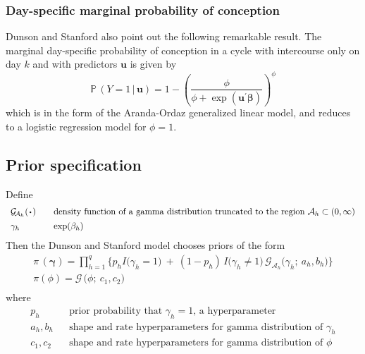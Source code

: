 \documentclass[11pt]{article}
\newcommand{\prob}{\mathbb{P}\,}
\renewcommand{\vec}{\boldsymbol}
\newcommand{\barS}{\,|\,}
\newcommand{\ind}{I}
\newcommand{\cdotB}{\raisebox{-0.5ex}{\scalebox{1.75}{$\cdot$}}}
\begin{document}

\subsubsection{Day-specific marginal probability of conception}
Dunson and Stanford also point out the following remarkable result.  The marginal day-specific probability of conception in a cycle with intercourse only on day $k$ and with predictors $\vec{u}$ is given by
\[ \prob( Y = 1 \barS \vec{u} ) = 1 - \left( \frac{ \phi }{ \phi + \exp(\vec{u}^\prime \vec{\beta}) } \right)^\phi \]
which is in the form of the Aranda-Ordaz generalized linear model, and reduces to a logistic regression model for $\phi = 1$.







\subsection{Prior specification}

Define 
\[ \begin{array}{lll}
\mathcal{G}_{\!\mathcal{A}_h} ( \cdotB ) & & \text{density function of a gamma distribution truncated to the region $\mathcal{A}_h \subset (0,\infty)$} \\[1ex]
\gamma_h & & \exp( \beta_h ) 
\end{array} \]
Then the Dunson and Stanford model chooses priors of the form
\[ \begin{array}{l}
\pi\,(\vec{\gamma}) = \displaystyle \prod_{h=1}^q \bigg\{ p_h \ind\big( \gamma_h = 1 \big) ~+~ (1 - p_h)\, \ind\big( \gamma_h \ne 1 \big)\, \mathcal{G}_{\mathcal{A}_h} \big( \gamma_h;~ a_h, b_h \big) \bigg\} \\[3ex]
\pi(\phi) = \mathcal{G}\, \big(\phi;~ c_1, c_2\big) \\
\end{array} \]
where
\[ \begin{array}{lll}
p_h & & \text{prior probability that $\gamma_h=1$, a hyperparameter} \\[1ex]
a_h,b_h & & \text{shape and rate hyperparameters for gamma distribution of $\gamma_h$} \\[1ex]
c_1,c_2 & & \text{shape and rate hyperparameters for gamma distribution of $\phi$} \\
\end{array} \] \vspace{2mm}
\end{document}
